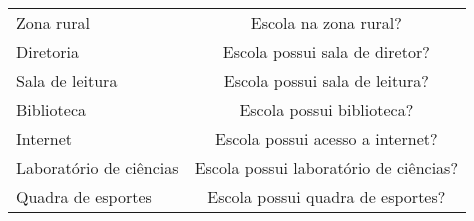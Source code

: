 \documentclass[
        12pt,                           %
        openright,                      %
        oneside,
        a4paper,                        %
        chapter=TITLE,         %
        section=TITLE,         %
        subsection=Title,      %
        english,                        %
        spanish,                        %
        portugues,                      %
        ]{abntex2}
\begin{document}
{\begin{apendicesenv}
\begin{landscape}
\begin{longtable}{cc}
\multicolumn{1}{l|}{Zona rural}                         & Escola na zona rural?                                                       \\
\multicolumn{1}{l|}{Diretoria}                    & Escola possui sala de diretor?                                              \\
\multicolumn{1}{l|}{Sala de leitura}                & Escola possui sala de leitura?                                          \\
\multicolumn{1}{l|}{Biblioteca}                         & Escola possui biblioteca?                                                   \\
\multicolumn{1}{l|}{Internet}                  & Escola possui acesso a internet?                                            \\
\multicolumn{1}{l|}{Laboratório de ciências}                         & Escola possui laboratório de ciências?                                                   \\
\multicolumn{1}{l|}{Quadra de esportes}                         & Escola possui quadra de esportes?                                                   \\


\end{longtable}
\end{landscape}
\end{apendicesenv}}
\end{document}
